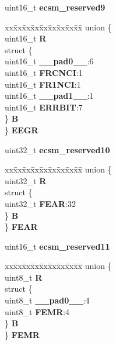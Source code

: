 \begin{DoxyCompactItemize}
\begin{tabbing}
\end{tabbing}\item 
\mbox{\label{structECSM__tag_ac07120680b43984b17c169504db77cc8}} 
uint16\+\_\+t {\bfseries ecsm\+\_\+reserved9}
\item 
\mbox{\label{structECSM__tag_ac5d7175014cff67b884e5f5c72ee461a}} 
\begin{tabbing}
xx\=xx\=xx\=xx\=xx\=xx\=xx\=xx\=xx\=\kill
union \{\\
\>uint16\_t {\bfseries R}\\
\>struct \{\\
\>\>uint16\_t {\bfseries \_\_pad0\_\_}:6\\
\>\>uint16\_t {\bfseries FRCNCI}:1\\
\>\>uint16\_t {\bfseries FR1NCI}:1\\
\>\>uint16\_t {\bfseries \_\_pad1\_\_}:1\\
\>\>uint16\_t {\bfseries ERRBIT}:7\\
\>\} {\bfseries B}\\
\} {\bfseries EEGR}\\

\end{tabbing}\item 
\mbox{\label{structECSM__tag_a4c1d12bba69b6688a04700da714a641e}} 
uint32\+\_\+t {\bfseries ecsm\+\_\+reserved10}
\item 
\mbox{\label{structECSM__tag_a11be86a38818b5ab267c301ecd3040b4}} 
\begin{tabbing}
xx\=xx\=xx\=xx\=xx\=xx\=xx\=xx\=xx\=\kill
union \{\\
\>uint32\_t {\bfseries R}\\
\>struct \{\\
\>\>uint32\_t {\bfseries FEAR}:32\\
\>\} {\bfseries B}\\
\} {\bfseries FEAR}\\

\end{tabbing}\item 
\mbox{\label{structECSM__tag_a0464bc95912250c016eea6b8a132e563}} 
uint16\+\_\+t {\bfseries ecsm\+\_\+reserved11}
\item 
\mbox{\label{structECSM__tag_a43d5763e1ad9af73684106ad4efcbe1c}} 
\begin{tabbing}
xx\=xx\=xx\=xx\=xx\=xx\=xx\=xx\=xx\=\kill
union \{\\
\>uint8\_t {\bfseries R}\\
\>struct \{\\
\>\>uint8\_t {\bfseries \_\_pad0\_\_}:4\\
\>\>uint8\_t {\bfseries FEMR}:4\\
\>\} {\bfseries B}\\
\} {\bfseries FEMR}\\


\end{tabbing}
\end{DoxyCompactItemize}
